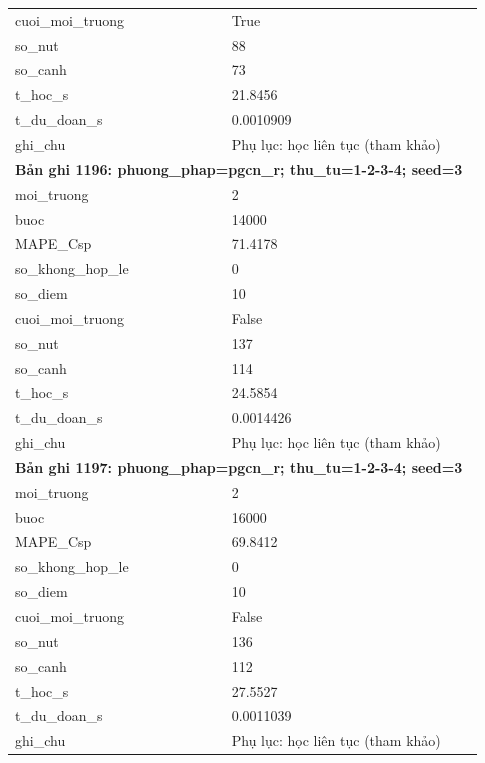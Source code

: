 \begin{longtable}{p{0.43\linewidth}p{0.50\linewidth}}
cuoi\_\allowbreak moi\_\allowbreak truong & True \\
so\_\allowbreak nut & 88 \\
so\_\allowbreak canh & 73 \\
t\_\allowbreak hoc\_\allowbreak s & 21.8456 \\
t\_\allowbreak du\_\allowbreak doan\_\allowbreak s & 0.0010909 \\
ghi\_\allowbreak chu & Phụ lục: học liên tục (tham khảo) \\
\midrule
\multicolumn{2}{p{0.95\linewidth}}{\textbf{Bản ghi 1196: phuong\_phap=pgcn\_r; thu\_tu=1-2-3-4; seed=3}} \\
moi\_\allowbreak truong & 2 \\
buoc & 14000 \\
MAPE\_\allowbreak Csp & 71.4178 \\
so\_\allowbreak khong\_\allowbreak hop\_\allowbreak le & 0 \\
so\_\allowbreak diem & 10 \\
cuoi\_\allowbreak moi\_\allowbreak truong & False \\
so\_\allowbreak nut & 137 \\
so\_\allowbreak canh & 114 \\
t\_\allowbreak hoc\_\allowbreak s & 24.5854 \\
t\_\allowbreak du\_\allowbreak doan\_\allowbreak s & 0.0014426 \\
ghi\_\allowbreak chu & Phụ lục: học liên tục (tham khảo) \\
\midrule
\multicolumn{2}{p{0.95\linewidth}}{\textbf{Bản ghi 1197: phuong\_phap=pgcn\_r; thu\_tu=1-2-3-4; seed=3}} \\
moi\_\allowbreak truong & 2 \\
buoc & 16000 \\
MAPE\_\allowbreak Csp & 69.8412 \\
so\_\allowbreak khong\_\allowbreak hop\_\allowbreak le & 0 \\
so\_\allowbreak diem & 10 \\
cuoi\_\allowbreak moi\_\allowbreak truong & False \\
so\_\allowbreak nut & 136 \\
so\_\allowbreak canh & 112 \\
t\_\allowbreak hoc\_\allowbreak s & 27.5527 \\
t\_\allowbreak du\_\allowbreak doan\_\allowbreak s & 0.0011039 \\
ghi\_\allowbreak chu & Phụ lục: học liên tục (tham khảo) \\

\end{longtable}
